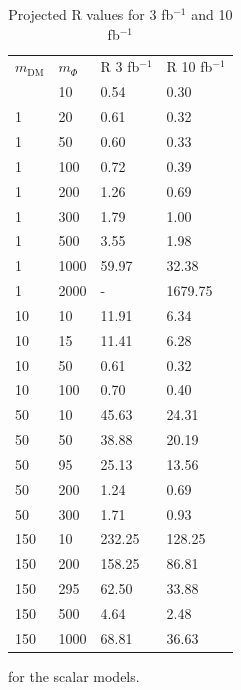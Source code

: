 \begin{table}[h]
\centering
\begin{tabular}{llll}
\hline                      
 $m_\textrm{DM}$ & $m_\Phi$  & R 3 fb$^{-1}$ & R 10 fb$^{-1}$ \\ \hlin
1	& 10	& 0.54	& 0.30 \\ \hline
1	& 20	& 0.61	& 0.32 \\ \hline
1	& 50	& 0.60	& 0.33 \\ \hline
1	& 100	& 0.72	& 0.39 \\ \hline
1	& 200	& 1.26	& 0.69 \\ \hline
1	& 300	& 1.79	& 1.00 \\ \hline
1	& 500	& 3.55	& 1.98 \\ \hline
1	& 1000	& 59.97	& 32.38 \\ \hline
1	& 2000	& -    & 1679.75 \\ \hline
10	& 10	& 11.91	& 6.34 \\ \hline 
10	& 15	& 11.41	& 6.28 \\ \hline
10	& 50	& 0.61	& 0.32 \\ \hline
10	& 100	& 0.70	& 0.40 \\ \hline
50	& 10	& 45.63	& 24.31 \\ \hline
50	& 50	& 38.88	& 20.19 \\ \hline
50	& 95	& 25.13	& 13.56 \\ \hline
50	& 200	& 1.24	& 0.69 \\ \hline
50	& 300	& 1.71	& 0.93 \\ \hline
150	& 10	& 232.25& 128.25 \\ \hline
150	& 200	& 158.25& 86.81 \\ \hline
150	& 295	& 62.50	& 33.88 \\ \hline
150	& 500	& 4.64	& 2.48 \\ \hline
150	& 1000	& 68.81	& 36.63 \\ \hline
\end{tabular}
\caption{Projected R values for 3 fb$^{-1}$ and 10 fb$^{-1}$} for the scalar models.
\label{tab:dm_S_R_values}
\end{table}


